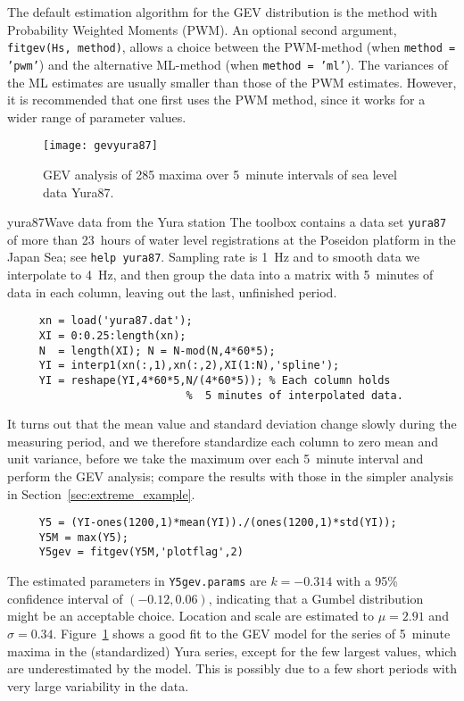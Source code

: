 The default estimation algorithm for the GEV distribution is the
method with Probability Weighted Moments (PWM). An optional second
argument, {\tt fitgev(Hs, method)}, allows a choice between
the PWM-method (when {\tt method = 'pwm'}) and the alternative ML-method
(when {\tt method = 'ml'}). The variances of the ML estimates are
usually smaller than those of the PWM estimates. However, it is
recommended that one first uses the PWM method, since it works for a
wider range of parameter values.
\begin{figure}[tbh]
\centerline{
\texttt{[image: gevyura87]}
}
\vspace{-3mm}
\caption[GEV analysis of sea level data]{
GEV analysis of 285 maxima over 5~minute intervals of sea level
data Yura87.}
\label{fig7-2b}
\end{figure}

\begin{rtex}{yura87}{Wave data from the Yura station}
The \progname{} toolbox contains a data set {\tt yura87} of more than 23~hours
of water level registrations at the Poseidon platform in the Japan Sea;
see {\tt help yura87}. Sampling rate is 1~Hz and to smooth data we
interpolate to 4~Hz, and then group the data into a matrix with 5~minutes
of data in each column, leaving out the last, unfinished period.
{\small
\begin{verbatim}
     xn = load('yura87.dat');
     XI = 0:0.25:length(xn);
     N  = length(XI); N = N-mod(N,4*60*5);
     YI = interp1(xn(:,1),xn(:,2),XI(1:N),'spline');
     YI = reshape(YI,4*60*5,N/(4*60*5)); % Each column holds
                            %  5 minutes of interpolated data.
\end{verbatim}
}
\noindent
It turns out that the mean value and standard deviation change slowly
during the measuring period, and we therefore standardize each column
to zero mean and unit variance, before we take the maximum over each
5~minute interval and perform the GEV analysis; compare the results
with those in the simpler analysis in Section~\ref{sec:extreme_example}.
{\small
\begin{verbatim}
     Y5 = (YI-ones(1200,1)*mean(YI))./(ones(1200,1)*std(YI));
     Y5M = max(Y5);
     Y5gev = fitgev(Y5M,'plotflag',2)
\end{verbatim}
}
The estimated parameters in {\tt Y5gev.params} are $k = -0.314$ with a 95\%
confidence interval of $(-0.12, 0.06)$, indicating that a Gumbel
distribution might be an acceptable choice. Location and scale are estimated
to $\mu = 2.91$ and $\sigma = 0.34$. Figure~\ref{fig7-2b}
shows a good fit to the GEV model for the series of 5~minute
maxima in the (standardized) Yura series, except for the
few largest values, which are underestimated by the model.
This is possibly due to a few short periods
with very large variability in the data.
\end{rtex}

